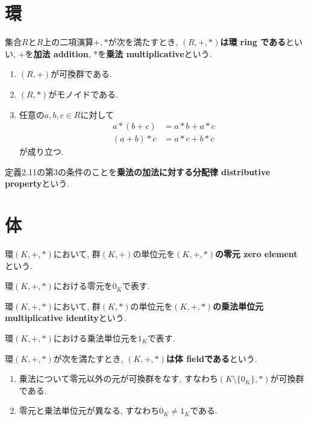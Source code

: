 \section{環}
\begin{Def}
集合$R$と$R$上の二項演算$+,*$が次を満たすとき, {\bf $(R,+,*)$は環 ring である}といい, $+$を{\bf 加法 addition}, $*$を{\bf 乗法 
multiplicative}という. 
\begin{enumerate}
\item $(R,+)$が可換群である.
\item $(R,*)$がモノイドである.
\item 任意の$a,b,c\in R$に対して
\begin{align*}
a*(b+c)&=a*b+a*c\\
(a+b)*c&=a*c+b*c
\end{align*}
が成り立つ.
\end{enumerate}
\end{Def}

定義2.11の第3の条件のことを{\bf 乗法の加法に対する分配律 distributive property}という.

\section{体}
\begin{Def}
環$(K,+,*)$において,
群$(K,+)$の単位元を{\bf $(K,+,*)$の零元 zero element} という.
\end{Def}
\begin{Notation}
環$(K,+,*)$における零元を$0_K$で表す.
\end{Notation}
\begin{Def}
環$(K,+,*)$において,
群$(K,*)$の単位元を{\bf $(K,+,*)$の乗法単位元 multiplicative identity}という.
\end{Def}
\begin{Notation}
環$(K,+,*)$における乗法単位元を$1_K$で表す.
\end{Notation}

\begin{Def}
環$(K,+,*)$が次を満たすとき, {\bf $(K,+,*)$は体 fieldである}という.
\begin{enumerate}
\item 乗法について零元以外の元が可換群をなす, すなわち$(K\setminus\{0_K\},*)$が可換群である.
\item 零元と乗法単位元が異なる, すなわち$0_K\neq 1_K$である.
\end{enumerate}
\end{Def}